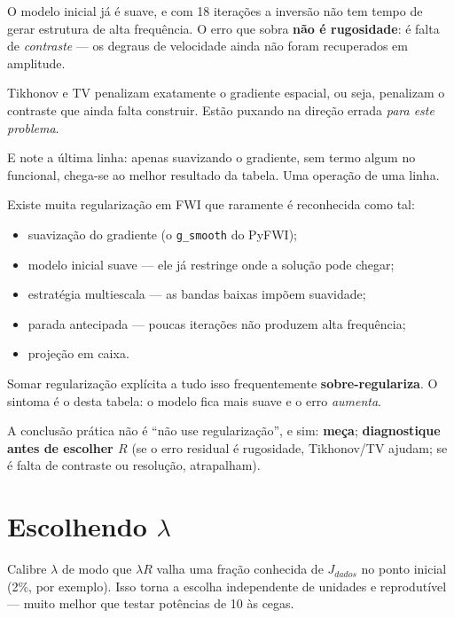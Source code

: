 \documentclass[11pt,a4paper,oneside]{report}
\begin{document}
\begin{teoria}
O modelo inicial já é suave, e com 18 iterações a inversão não tem tempo de
gerar estrutura de alta frequência. O erro que sobra \textbf{não é rugosidade}:
é falta de \emph{contraste} --- os degraus de velocidade ainda não foram
recuperados em amplitude.

Tikhonov e TV penalizam exatamente o gradiente espacial, ou seja, penalizam o
contraste que ainda falta construir. Estão puxando na direção errada
\emph{para este problema}.

E note a última linha: apenas suavizando o gradiente, sem termo algum no
funcional, chega-se ao melhor resultado da tabela. Uma operação de uma linha.
\end{teoria}

\begin{pratica}
Existe muita regularização em FWI que raramente é reconhecida como tal:
\begin{itemize}[leftmargin=*]
\item suavização do gradiente (o \texttt{g\_smooth} do PyFWI);
\item modelo inicial suave --- ele já restringe onde a solução pode chegar;
\item estratégia multiescala --- as bandas baixas impõem suavidade;
\item parada antecipada --- poucas iterações não produzem alta frequência;
\item projeção em caixa.
\end{itemize}

Somar regularização explícita a tudo isso frequentemente
\textbf{sobre-regulariza}. O sintoma é o desta tabela: o modelo fica mais
suave e o erro \emph{aumenta}.

A conclusão prática não é ``não use regularização'', e sim: \textbf{meça};
\textbf{diagnostique antes de escolher $R$} (se o erro residual é rugosidade,
Tikhonov/TV ajudam; se é falta de contraste ou resolução, atrapalham).
\end{pratica}

\section{Escolhendo $\lambda$}

Calibre $\lambda$ de modo que $\lambda R$ valha uma fração conhecida de
$J_{dados}$ no ponto inicial (2\%, por exemplo). Isso torna a escolha
independente de unidades e reprodutível --- muito melhor que testar potências
de 10 às cegas.
\end{document}
